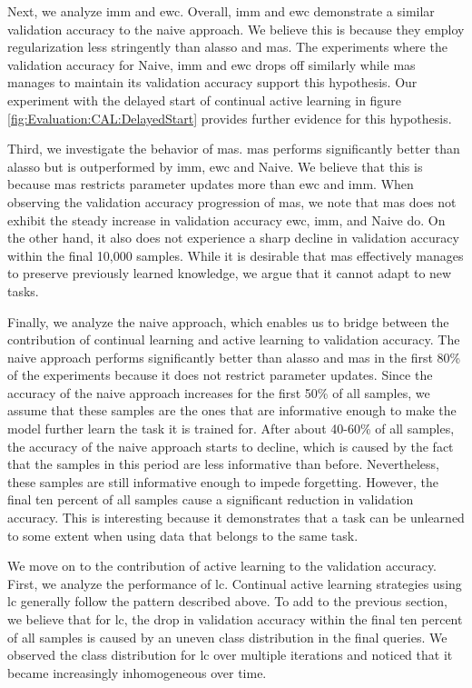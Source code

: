 Next, we analyze \gls{imm} and \gls{ewc}. Overall, \gls{imm} and \gls{ewc} demonstrate a similar validation accuracy to the naive approach. We believe this is
because they employ regularization less stringently than \gls{alasso} and \gls{mas}. The experiments where the validation accuracy for Naive, \gls{imm} and \gls{ewc}
drops off similarly while \gls{mas} manages to maintain its validation accuracy support this hypothesis. Our experiment with the delayed start of continual active
learning in figure \ref{fig:Evaluation:CAL:DelayedStart} provides further evidence for this hypothesis. \par
Third, we investigate the behavior of \gls{mas}. \gls{mas} performs significantly better than \gls{alasso} but is outperformed by \gls{imm}, \gls{ewc} and Naive.
We believe that this is because \gls{mas} restricts parameter updates more than \gls{ewc} and \gls{imm}. When observing the validation accuracy progression of
\gls{mas}, we note that \gls{mas} does not exhibit the steady increase in validation accuracy \gls{ewc}, \gls{imm}, and Naive do. On the other hand,
it also does not experience a sharp decline in validation accuracy within the final 10,000 samples. While it is desirable that \gls{mas} effectively manages
to preserve previously learned knowledge, we argue that it cannot adapt to new tasks. \par

Finally, we analyze the naive approach, which enables us to bridge between the contribution of continual learning and active learning to validation accuracy.
The naive approach performs significantly better than \gls{alasso} and \gls{mas} in the first 80\% of the experiments because it does not restrict parameter updates. 
Since the accuracy of the naive approach increases for the first 50\% of all samples, we assume that these samples are the ones that are informative enough
to make the model further learn the task it is trained for. After about 40-60\% of all samples, the accuracy of the naive approach starts to decline, which is caused
by the fact that the samples in this period are less informative than before. Nevertheless, these samples are still informative enough to impede forgetting. 
However, the final ten percent of all samples cause a significant reduction in validation accuracy. This is interesting because it demonstrates that a task can be
unlearned to some extent when using data that belongs to the same task. \par
We move on to the contribution of active learning to the validation accuracy. First, we analyze the performance of \gls{lc}. Continual active learning strategies
using \gls{lc} generally follow the pattern described above. To add to the previous section, we believe that for \gls{lc}, the drop in
validation accuracy within the final ten percent of all samples is caused by an uneven class distribution in the final queries. We observed the class distribution
for \gls{lc} over multiple iterations and noticed that it became increasingly inhomogeneous over time. \par


